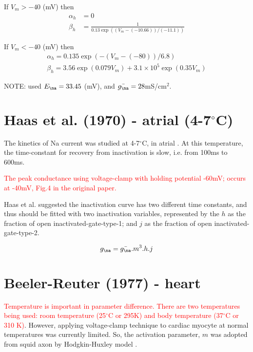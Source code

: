 If $V_m > -40$ (mV) then
\begin{equation}
\begin{split}
\alpha_h &= 0 \\
\beta_h &= \frac{1}{0.13 \exp \left( (V_m - (-10.66))/(-11.1) \right)}
\end{split}
\end{equation}

If $V_m < -40$ (mV) then
\begin{equation}
\begin{split}
\alpha_h = 0.135 \exp \left( -(V_m - (-80))/ 6.8 \right) \\
\beta_h = 3.56 \exp \left( 0.079 V_m \right) + 3.1 \times 10^5 \exp \left( 0.35
V_m \right)
\end{split}
\end{equation}

NOTE: \citep{spach1995} used $E_\na = 33.45$ (mV), and $\bar{g_\na} =
28$mS/cm$^2$.
\section{Haas et al. (1970) - atrial (4-7$^\circ$C)}
\label{sec:Ina_Haas}

The kinetics of Na current was studied at 4-7$^\circ$C, in atrial
\citep{haas1971}. At this temperature, the time-constant for
recovery from inactivation is slow, i.e. from 100ms to 600ms. 

\textcolor{red}{The peak conductance using voltage-clamp with holding potential
-60mV; occurs at -40mV, Fig.4 in the original paper.}

Haas et al. suggested the inactivation curve has two different time constants,
and thus should be fitted with two inactivation variables, represented by the
$h$ as the fraction of open inactivated-gate-type-1; and $j$ as the fraction of
open inactivated-gate-type-2.

\begin{equation}
g_\na  = \bar{g_\na}.m^3.h.j
\end{equation}
\section{Beeler-Reuter (1977) - heart}
\label{sec:Ina_Beeler-Reuter_1977}

\textcolor{red}{Temperature is important in parameter difference. There are two
temperatures being used: room temperature (25$^\circ$C or 295K) and body
temperature (37$^\circ$C or 310 K)}. However, applying voltage-clamp technique
to cardiac myocyte at normal temperatures was currently limited. So, the
activation parameter, $m$ was adopted from squid axon by Hodgkin-Huxley model
\citep{hodgkin1952ap}.

